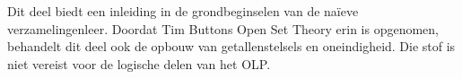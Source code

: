 \documentclass[../../include/open-logic-part]{subfiles}
\begin{document}

\begin{editorial}
  Dit deel biedt een inleiding in de grondbeginselen van de naïeve
  verzamelingenleer. Doordat Tim Buttons Open Set Theory erin is opgenomen,
  behandelt dit deel ook de opbouw van getallenstelsels en oneindigheid. Die
  stof is niet vereist voor de logische delen van het OLP.
\end{editorial}







\OLEndPartHook
\end{document}
